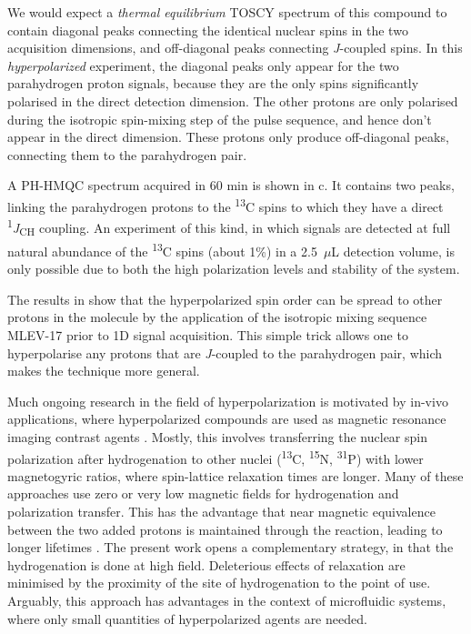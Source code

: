 We would expect a \emph{thermal equilibrium} TOSCY spectrum of this compound to
contain diagonal peaks connecting the identical nuclear spins in the two
acquisition dimensions, and off-diagonal peaks connecting \emph{J}-coupled
spins. In this \emph{hyperpolarized} experiment, the diagonal peaks only appear
for the two parahydrogen proton signals, because they are the only spins
significantly polarised in the direct detection dimension. The other protons
are only polarised during the isotropic spin-mixing step of the pulse sequence,
and hence don't appear in the direct dimension. These protons only produce
off-diagonal peaks, connecting them to the parahydrogen pair.

A PH-HMQC spectrum acquired in 60 min is shown in c.
It contains two peaks, linking the parahydrogen protons to the
\textsuperscript{13}C spins to which they have a direct
\textsuperscript{1}\emph{J}\textsubscript{CH} coupling.
An experiment of this kind, in which signals are
detected at full natural abundance of the \textsuperscript{13}C spins (about
1\%) in a 2.5~$\mu$L  detection volume, is only possible due to both the high
polarization levels and stability of the system.

The results in  show that the hyperpolarized spin order
can be spread to other
protons in the molecule by the application of the isotropic mixing
sequence MLEV-17
 \cite{levittSupercyclesBroadbandHeteronuclear1982,baxMLEV17basedTwodimensionalHomonuclear1985}
 prior to 1D signal acquisition.
\cbend
 This simple trick
allows one to hyperpolarise any protons that are \emph{J}-coupled to the
parahydrogen pair, which makes the technique more general.

Much ongoing research in the field of hyperpolarization is
motivated by in-vivo applications, where hyperpolarized compounds
are used as magnetic
resonance imaging contrast agents \cite{Hovener:2018cg}.
Mostly, this involves transferring the
nuclear spin polarization after hydrogenation to other nuclei
(\textsuperscript{13}C, \textsuperscript{15}N, \textsuperscript{31}P) with
lower magnetogyric ratios, where spin-lattice relaxation times are longer.
\cite{Goldman:2005bf,Goldman:2006cp,Reineri:2015he} Many of these approaches
use zero or very low magnetic fields for hydrogenation and polarization
transfer. This has the advantage that near magnetic equivalence between the two
added protons is maintained through the reaction, leading to longer lifetimes
\cite{bhattacharya2007towards,chekmenev2008pasadena,
chekmenev2009hyperpolarized,shchepin2014parahydrogen,
Reineri:2015he,cavallari201813,ripka2018hyperpolarized,roy2018sabre}.
The present work opens a complementary strategy, in that the hydrogenation
is done at high field. Deleterious effects of relaxation are minimised by
the proximity of the site of hydrogenation to the point of use. Arguably,
this approach has advantages in the context of microfluidic systems, where
only small quantities of hyperpolarized agents are needed.

